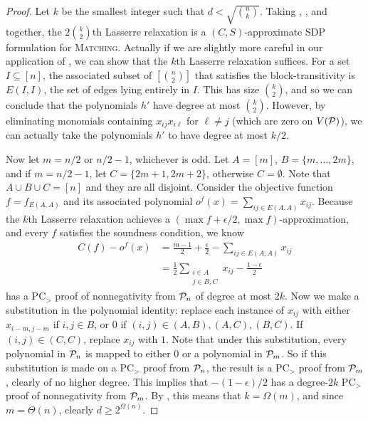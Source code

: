\begin{proof}
Let $k$ be the smallest integer such that $d < \sqrt{\binom{n}{k}}$. Taking , , and  together, the $2\binom{k}{2}$th Lasserre relaxation is a $(C,S)$-approximate SDP formulation for \textsc{Matching}. Actually if we are slightly more careful in our application of , we can show that the $k$th Lasserre relaxation suffices. For a set $I \subseteq [n]$, the associated subset of $\left[\binom{n}{2}\right]$ that satisfies the block-transitivity is $E(I,I)$, the set of edges lying entirely in $I$. This has size $\binom{k}{2}$, and so we can conclude that the polynomials $h'$ have degree at most $\binom{k}{2}$. However, by eliminating monomials containing $x_{ij}x_{i\ell}$ for $\ell \neq j$ (which are zero on $V(\mathcal P)$), we can actually take the polynomials $h'$ to have degree at most $k/2$. 

Now let $m = n/2$ or $n/2-1$, whichever is odd. Let $A = [m]$, $B = \{m,\dots, 2m\}$, and if $m = n/2-1$, let $C = \{2m+1,2m+2\}$, otherwise $C = \emptyset$. Note that $A \cup B \cup C = [n]$ and they are all disjoint. Consider the objective function $f = f_{E(A,A)}$ and its associated polynomial $o^f(x) = \sum_{ij \in E(A,A)} x_{ij}$. Because the $k$th Lasserre relaxation achieves a $(\max f + \epsilon/2,\max f)$-approximation, and every $f$ satisfies the soundness condition, we know
\begin{align*}
C(f) - o^f(x) &= \frac{m-1}{2} + \frac{\epsilon}{2} - \sum_{ij \in E(A,A)} x_{ij} \\
&= \frac{1}{2}\sum_{\substack{i \in A \\ j \in B,C}} x_{ij} - \frac{1-\epsilon}{2}
\end{align*}
has a PC$_>$ proof of nonnegativity from $\mathcal P_n$ of degree at most $2k$. Now we make a substitution in the polynomial identity: replace each instance of $x_{ij}$ with either $x_{i-m, j-m}$ if $i,j \in B$, or $0$ if $(i,j) \in (A,B), (A,C), (B,C)$. If $(i,j) \in (C,C)$, replace $x_{ij}$ with $1$. Note that under this substitution, every polynomial in $\mathcal P_n$ is mapped to either $0$ or a polynomial in $\mathcal P_m$. So if this substitution is made on a PC$_>$ proof from $\mathcal P_n$, the result is a PC$_>$ proof from $\mathcal P_m$, clearly of no higher degree. This implies that $-(1-\epsilon)/2$ has a degree-$2k$ PC$_>$ proof of nonnegativity from $\mathcal P_m$. By , this means that $k = \Omega(m)$, and since $m = \Theta(n)$, clearly $d \geq 2^{\Omega(n)}$.
\end{proof}
